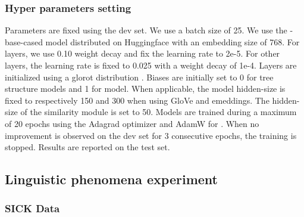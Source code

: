\subsubsection{Hyper parameters setting}

Parameters are fixed using the dev set. We use a batch size of 25. We use the \bert-base-cased model \parencite{devlin_19} distributed on Huggingface \parencite{wolf_19} with an embedding size of 768. For \bert layers, we use 0.10 weight decay and fix the learning rate to 2e-5. For other layers, the learning rate is fixed to 0.025 with a weight decay of 1e-4. Layers are initialized using a glorot distribution \parencite{glorot_10}. Biases are initially set to 0 for tree structure models and 1 for \seq model. When applicable, the model hidden-size is fixed to respectively 150 and 300 when using GloVe and \bert emeddings. The hidden-size of the similarity module is set to 50. Models are trained during a maximum of 20 epochs using the Adagrad optimizer \parencite{duchi_11} and AdamW for \bert \parencite{loshchilov_19}. When no improvement is observed on the dev set for 3 consecutive epochs, the training is stopped. Results are reported on the test set. 
% 
\subsection{Linguistic phenomena experiment}
\label{sec:linguistic-breakdown}


\subsubsection{SICK Data} 

